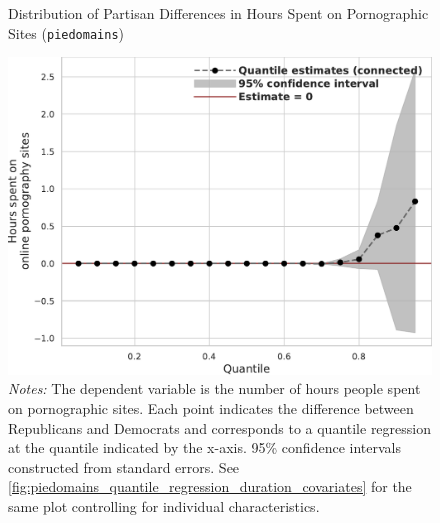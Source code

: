 \documentclass[12pt, letterpaper]{article}
\begin{document}
\begin{figure}[ht]
	\centering
	\caption{Distribution of Partisan Differences in Hours Spent on Pornographic Sites (\texttt{piedomains})}
	\includegraphics[width=.7\linewidth]{figs/piedomains_quantile_reg_duration_adult.pdf}
	\caption*{\footnotesize \emph{Notes:} 
		The dependent variable is the number of hours people spent on pornographic sites. Each point indicates the difference between Republicans and Democrats and corresponds to a quantile regression at the quantile indicated by the x-axis. 95\% confidence intervals constructed from standard errors. See \cref{fig:piedomains_quantile_regression_duration_covariates} for the same plot controlling for individual characteristics.
	}
	\label{fig:piedomains_quantile_regression_duration}
\end{figure}
\end{document}
